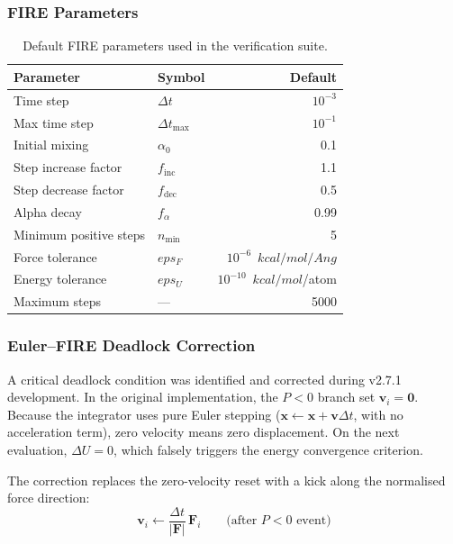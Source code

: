 \documentclass[11pt,twoside]{article}
\def\AA{Ang}%
\def\varepsilon{eps}%
\def\kcalmol{kcal/mol}%
\def\Angstrom{Ang}%
\newcommand{\Angstrom}{\text{\AA}}
\newcommand{\kcalmol}{\text{kcal/mol}}
\begin{document}
\subsubsection{FIRE Parameters}

\begin{table}[H]
\centering
\caption{Default FIRE parameters used in the verification suite.}
\label{tab:fire-params}
\begin{tabular}{llr}
\toprule
\textbf{Parameter} & \textbf{Symbol} & \textbf{Default} \\
\midrule
Time step           & $\Delta t$      & $10^{-3}$ \\
Max time step       & $\Delta t_{\max}$ & $10^{-1}$ \\
Initial mixing      & $\alpha_0$      & 0.1 \\
Step increase factor & $f_{\mathrm{inc}}$ & 1.1 \\
Step decrease factor & $f_{\mathrm{dec}}$ & 0.5 \\
Alpha decay         & $f_\alpha$      & 0.99 \\
Minimum positive steps & $n_{\min}$   & 5 \\
Force tolerance     & $\varepsilon_F$ & $10^{-6}$~$\kcalmol/\Angstrom$ \\
Energy tolerance    & $\varepsilon_U$ & $10^{-10}$~$\kcalmol$/atom \\
Maximum steps       & ---             & 5000 \\
\bottomrule
\end{tabular}
\end{table}

\subsubsection{Euler--FIRE Deadlock Correction}

A critical deadlock condition was identified and corrected during v2.7.1 development. In the original implementation, the $P < 0$ branch set $\mathbf{v}_i = \mathbf{0}$. Because the integrator uses pure Euler stepping ($\mathbf{x} \leftarrow \mathbf{x} + \mathbf{v}\Delta t$, with no acceleration term), zero velocity means zero displacement. On the next evaluation, $\Delta U = 0$, which falsely triggers the energy convergence criterion.

The correction replaces the zero-velocity reset with a kick along the normalised force direction:
\begin{equation}
  \mathbf{v}_i \leftarrow \frac{\Delta t}{|\mathbf{F}|} \, \mathbf{F}_i
  \qquad \text{(after $P < 0$ event)}
  \label{eq:fire-kick}
\end{equation}
\end{document}
